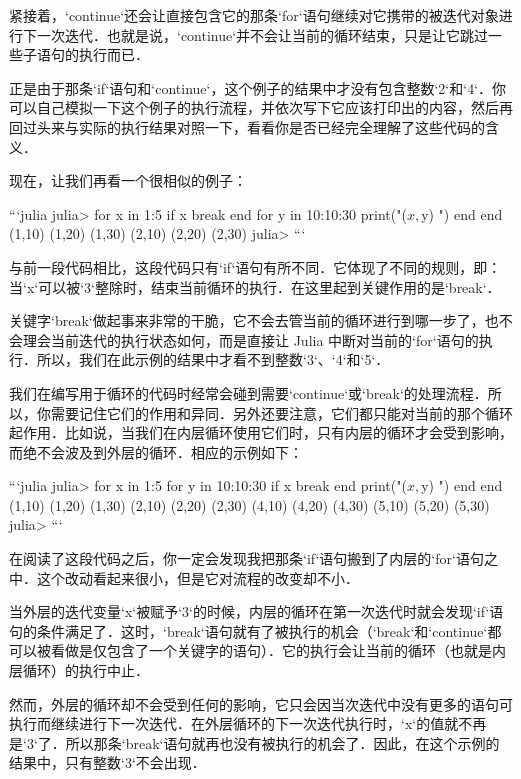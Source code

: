 紧接着，`continue`还会让直接包含它的那条`for`语句继续对它携带的被迭代对象进行下一次迭代．也就是说，`continue`并不会让当前的循环结束，只是让它跳过一些子语句的执行而已．

正是由于那条`if`语句和`continue`，这个例子的结果中才没有包含整数`2`和`4`．你可以自己模拟一下这个例子的执行流程，并依次写下它应该打印出的内容，然后再回过头来与实际的执行结果对照一下，看看你是否已经完全理解了这些代码的含义．

现在，让我们再看一个很相似的例子：

```julia
julia> for x in 1:5
           if x %
               break
           end
           for y in 10:10:30
               print("($x,$y) ")
           end
       end
(1,10) (1,20) (1,30) (2,10) (2,20) (2,30) 
julia> 
```

与前一段代码相比，这段代码只有`if`语句有所不同．它体现了不同的规则，即：当`x`可以被`3`整除时，结束当前循环的执行．在这里起到关键作用的是`break`．

关键字`break`做起事来非常的干脆，它不会去管当前的循环进行到哪一步了，也不会理会当前迭代的执行状态如何，而是直接让 Julia 中断对当前的`for`语句的执行．所以，我们在此示例的结果中才看不到整数`3`、`4`和`5`．

我们在编写用于循环的代码时经常会碰到需要`continue`或`break`的处理流程．所以，你需要记住它们的作用和异同．另外还要注意，它们都只能对当前的那个循环起作用．比如说，当我们在内层循环使用它们时，只有内层的循环才会受到影响，而绝不会波及到外层的循环．相应的示例如下：

```julia
julia> for x in 1:5
           for y in 10:10:30
               if x %
                   break
               end
               print("($x,$y) ")
           end
       end
(1,10) (1,20) (1,30) (2,10) (2,20) (2,30) (4,10) (4,20) (4,30) (5,10) (5,20) (5,30) 
julia> 
```

在阅读了这段代码之后，你一定会发现我把那条`if`语句搬到了内层的`for`语句之中．这个改动看起来很小，但是它对流程的改变却不小．

当外层的迭代变量`x`被赋予`3`的时候，内层的循环在第一次迭代时就会发现`if`语句的条件满足了．这时，`break`语句就有了被执行的机会（`break`和`continue`都可以被看做是仅包含了一个关键字的语句）．它的执行会让当前的循环（也就是内层循环）的执行中止．

然而，外层的循环却不会受到任何的影响，它只会因当次迭代中没有更多的语句可执行而继续进行下一次迭代．在外层循环的下一次迭代执行时，`x`的值就不再是`3`了．所以那条`break`语句就再也没有被执行的机会了．因此，在这个示例的结果中，只有整数`3`不会出现．

